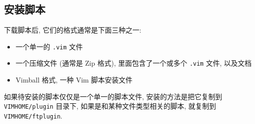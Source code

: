 \subsection{安装脚本}
\label{subsec:installing_scripts}

下载脚本后, 它们的格式通常是下面三种之一:
\begin{itemize}
    \item 一个单一的 \texttt{.vim} 文件
    \item 一个压缩文件 (通常是 Zip 格式), 里面包含了一个或多个 \texttt{.vim}
        文件, 以及文档
    \item Vimball 格式, 一种 Vim 脚本安装文件
\end{itemize}

如果待安装的脚本仅仅是一个单一的脚本文件, 安装的方法是把它复制到
\texttt{VIMHOME/plugin} 目录下, 如果是和某种文件类型相关的脚本, 就复制到
\texttt{VIMHOME/ftplugin}.
